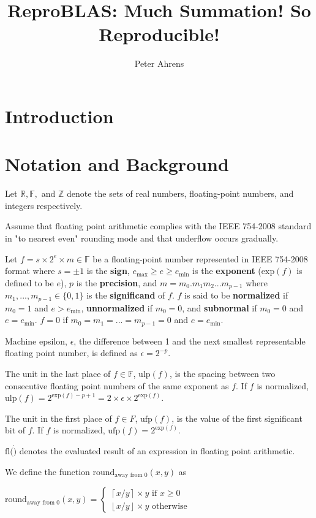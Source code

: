 \documentclass[12pt]{article}
\author{Peter Ahrens}
\title{ReproBLAS: Much Summation! So Reproducible!}
\providecommand{\ceil}[1]{\left \lceil #1 \right \rceil }
\providecommand{\floor}[1]{\left \lfloor #1 \right \rfloor }
\providecommand{\R}{\ensuremath{\mathbb{R}}}
\providecommand{\F}{\ensuremath{\mathbb{F}}}
\providecommand{\Z}{\ensuremath{\mathbb{Z}}}
\providecommand{\exp}{\ensuremath{\text{exp}}}
\providecommand{\min}{\ensuremath{\text{min}}}
\providecommand{\max}{\ensuremath{\text{max}}}
\providecommand{\ulp}{\ensuremath{\text{ulp}}}
\providecommand{\ufp}{\ensuremath{\text{ufp}}}
\providecommand{\fl}{\ensuremath{\text{fl}}}
\providecommand{\roundfromzero}{\ensuremath{\text{round}_\text{away from 0}}}
\theoremstyle{plain}
\begin{document}
\noindent
\maketitle
\tableofcontents
\newpage
\section{Introduction}

\section{Notation and Background}
  Let $\R, \F, $ and $\Z$ denote the sets of real numbers, floating-point numbers, and integers respectively.

  Assume that floating point arithmetic complies with the IEEE 754-2008 standard \cite{ieee754} in "to nearest even" rounding mode and that underflow occurs gradually.

  Let $f = s \times 2^e \times m \in \F$ be a floating-point number represented in IEEE 754-2008 format \cite{ieee754} where $s = \pm 1$ is the \textbf{sign}, $e_{\max} \geq e \geq e_{\min}$ is the \textbf{exponent} ($\exp(f)$ is defined to be $e$), $p$ is the \textbf{precision}, and $m = m_0.m_1m_2...m_{p-1}$ where $m_1, ..., m_{p - 1} \in \{0, 1\}$ is the \textbf{significand} of $f$. $f$ is said to be \textbf{normalized} if $m_0 = 1$ and $e > e_{\min}$, \textbf{unnormalized} if $m_0 = 0$, and \textbf{subnormal} if $m_0 = 0$ and $e = e_{\min}$. $f = 0$ if $m_0 = m_1 = ... = m_{p - 1} = 0$ and $e = e_{\min}$.

  Machine epsilon, $\epsilon$, the difference between 1 and the next smallest representable floating point number, is defined as $\epsilon = 2^{-p}$.

  The unit in the last place of $f \in \F$, $\ulp(f)$, is the spacing between two consecutive floating point numbers of the same exponent as $f$. If $f$ is normalized, $\ulp(f) = 2^{\exp(f) - p + 1} = 2 \times \epsilon \times 2^{\exp(f)}$.

  The unit in the first place of $f \in F$, $\ufp(f)$, is the value of the first significant bit of $f$. If $f$ is normalized, $\ufp(f) = 2^{\exp(f)}$.

  $\fl(\dot)$ denotes the evaluated result of an expression in floating point arithmetic.

  We define the function $\roundfromzero(x, y)$ as

  $\roundfromzero(x, y) = \begin{cases}\ceil{x/y} \times y \text{ if } x \geq 0\\ \floor{x/y}\times y \text{ otherwise}\end{cases}$
\end{document}
